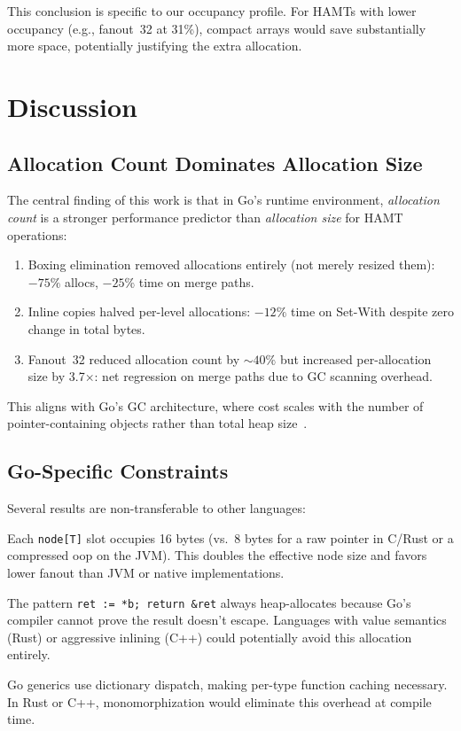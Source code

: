 \documentclass[11pt,twocolumn]{article}
\begin{document}
This conclusion is specific to our occupancy profile.
For HAMTs with lower occupancy (e.g., fanout~32 at 31\%), compact arrays
would save substantially more space, potentially justifying the extra
allocation.

\section{Discussion}
\label{sec:discussion}

\subsection{Allocation Count Dominates Allocation Size}

The central finding of this work is that in Go's runtime environment,
\emph{allocation count} is a stronger performance predictor than
\emph{allocation size} for HAMT operations:

\begin{enumerate}[nosep]
  \item Boxing elimination removed allocations entirely (not merely resized
        them): $-75\%$ allocs, $-25\%$ time on merge paths.
  \item Inline copies halved per-level allocations: $-12\%$ time on
        Set-With despite zero change in total bytes.
  \item Fanout~32 reduced allocation count by $\sim 40\%$ but increased
        per-allocation size by 3.7$\times$: net regression on merge paths
        due to GC scanning overhead.
\end{enumerate}

This aligns with Go's GC architecture, where cost scales with the number of
pointer-containing objects rather than total heap size~\cite{hudson2018}.

\subsection{Go-Specific Constraints}

Several results are non-transferable to other languages:

\begin{description}[nosep,leftmargin=1em]
  \item[Interface overhead.] Each \texttt{node[T]} slot occupies 16 bytes
    (vs.\ 8 bytes for a raw pointer in C/Rust or a compressed oop on the
    JVM). This doubles the effective node size and favors lower fanout than
    JVM or native implementations.
  \item[Escape analysis.] The pattern \texttt{ret := *b; return \&ret} always
    heap-allocates because Go's compiler cannot prove the result doesn't
    escape. Languages with value semantics (Rust) or aggressive inlining
    (C++) could potentially avoid this allocation entirely.
  \item[No monomorphization.] Go generics use dictionary dispatch, making
    per-type function caching necessary. In Rust or C++, monomorphization
    would eliminate this overhead at compile time.
\end{description}
\end{document}
